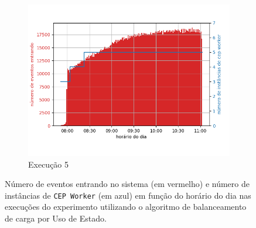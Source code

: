 \begin{figure}[p]
\begin{subfigure}{.5\textwidth}
  \includegraphics[width=\linewidth]{figuras/graphics/carga_e_workers_horario10-dez-su.png}  
  \caption{Execução 5}
  \label{fig:cewh-10-dez-su}
\end{subfigure}
\caption{Número de eventos entrando no sistema (em vermelho) e número de instâncias de \texttt{CEP Worker} (em azul) em função do horário do dia nas  execuções do experimento utilizando o algoritmo de balanceamento de carga por Uso de Estado.}
\label{fig:load_and_instances-time-SU}

\end{figure}



